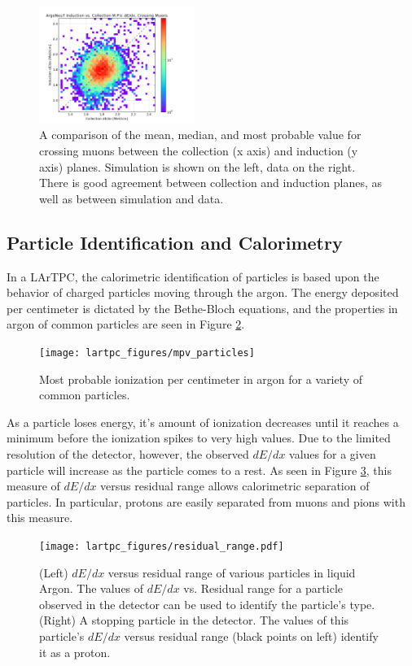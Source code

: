 \begin{figure}[p]
  \includegraphics[width=0.45\textwidth]{lartpc_figures/mpv_coll_vs_ind_data.png}
  \caption[Cross Plane Calibration Checks]{A comparison of the mean, median, and most probable value for crossing muons between the collection (x axis) and induction (y axis) planes.  Simulation is shown on the left, data on the right.  There is good agreement between collection and induction planes, as well as between simulation and data.}
  \label{fig:coll_ind_differences}
\end{figure}

\subsection{Particle Identification and Calorimetry}

In a LArTPC, the calorimetric identification of particles is based upon the behavior of charged particles moving through the argon.  The energy deposited per centimeter is dictated by the Bethe-Bloch equations, and the properties in argon of common particles are seen in Figure \ref{fig:bethe_bloch}.

\begin{figure}[htbp]
  \centering
  \texttt{[image: lartpc\_figures/mpv\_particles]}
  \caption[MPV Ionization in Argon for Common Species of Particles]{Most probable ionization per centimeter in argon for a variety of common particles.}
  \label{fig:bethe_bloch}
\end{figure}

As a particle loses energy, it's amount of ionization decreases until it reaches a minimum before the ionization spikes to very high values.  Due to the limited resolution of the detector, however, the observed $dE/dx$ values for a given particle will increase as the particle comes to a rest.  As seen in Figure \ref{fig:residual_range}, this measure of $dE/dx$ versus residual range allows calorimetric separation of particles.  In particular, protons are easily separated from muons and pions with this measure.

\begin{figure}[tb]
  \centering
  \texttt{[image: lartpc\_figures/residual\_range.pdf]}
  \caption[Residual Range]{(Left) $dE/dx$ versus residual range of various particles in liquid Argon.  The values of $dE/dx$ vs. Residual range for a particle observed in the detector can be used to identify the particle's type. (Right) A stopping particle in the \argoneut detector.  The values of this particle's $dE/dx$ versus residual range (black points on left) identify it as a proton.}
  \label{fig:residual_range}
\end{figure}

